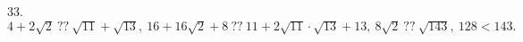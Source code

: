 33. $4+2\sqrt{2}\ ??\ \sqrt{11}+\sqrt{13},\ 16+16\sqrt{2}+8\ ??\ 11+2\sqrt{11}\cdot\sqrt{13}+13,\ 8\sqrt{2}\ ??\ \sqrt{143},\ 128<143.$\\
